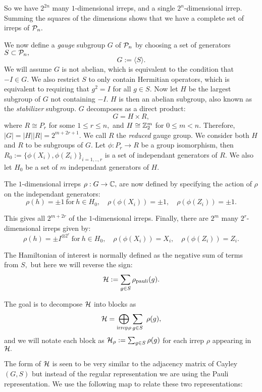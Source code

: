 \documentclass[12pt,notitlepage,longbibliography,nofootinbib,tightenlines]{revtex4}
\begin{document}
So we have $2^{2n}$ many $1$-dimensional irreps,
and a single $2^n$-dimensional irrep.
Summing the squares of the dimensions
shows that we have a complete set of irreps of $\mathcal{P}_n.$

We now define a {\it gauge} subgroup $G$ of $\mathcal{P}_n$
by choosing a set of generators $S\subset \mathcal{P}_n,$
$$ G := \langle S\rangle.$$
We will assume $G$ is not abelian, which is
equivalent to the condition that $-I\in G.$
We also restrict $S$ to only contain Hermitian operators,
which is equivalent to requiring that $g^2=I$ for all $g\in S.$
Now let $H$ be the largest subgroup of $G$ not containing
$-I.$
$H$ is then an abelian subgroup,
also known as the {\it stabilizer} subgroup.
$G$ decomposes as a direct product:
$$G = H\times R,$$
where $R\cong P_r$ for some $1\le r\le n,$
and $H\cong \mathbb{Z}_2^{m}$ for $0\le m<n.$
Therefore, $|G| = |H| |R| = 2^{m+2r+1}.$
We call $R$ the {\it reduced} gauge group.
We consider both $H$ and $R$ to be subgroups of $G.$
Let $\phi:P_r\to R$ be a group isomorphism,
then $R_0 := \{\phi(X_i), \phi(Z_i)\}_{i=1,..,r}$
is a set of independant generators of $R.$
We also let $H_0$ be a set of $m$ independant generators of $H.$

The $1$-dimensional irreps $\rho:G\to \mathbb{C},$
are now defined by
specifying the action of $\rho$ on the independant generators:
$$
    \rho(h)=\pm 1\ \mbox{for}\ h\in H_0,
    \quad \rho(\phi(X_i)) = \pm 1,\quad \rho(\phi(Z_i)) = \pm 1.
$$

This gives all $2^{m+2r}$ of the $1$-dimensional irreps.
Finally, there are $2^m$ many $2^r$-dimensional irreps given by:
$$
    \rho(h)=\pm I^{\otimes 2^r}\ \mbox{for}\ h\in H_0,
    \quad \rho(\phi(X_i)) = X_i,\quad \rho(\phi(Z_i)) = Z_i.
$$


The Hamiltonian of interest is normally defined
as the negative sum of terms from $S,$ but here
we will reverse the sign:
$$ \mathcal{H} := \sum_{g\in S} \rho_{\mathrm{pauli}}(g).$$

The goal is to decompose $\mathcal{H}$ into blocks as
$$
    \mathcal{H} = \bigoplus_{\mathrm{irrep}\rho} \sum_{g\in S}\ \rho(g),
$$
and we will notate each block as
$\mathcal{H}_\rho := \sum_{g\in S}\rho(g)$
for each irrep $\rho$ appearing in $\mathcal{H}.$

The form of $\mathcal{H}$ is seen to be very similar
to the adjacency matrix of Cayley$(G, S)$ but
instead of the regular representation we are
using the Pauli representation.
We use the following map to
relate these two representations:
\end{document}
